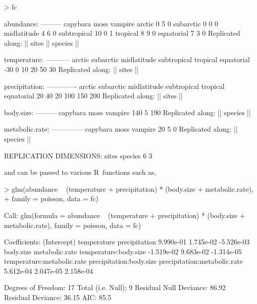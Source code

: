 \documentclass{article}
\newcommand{\R}{{\sf R}}
\numberwithin{exercise}{section}
\begin{document}
\begin{Schunk}
\begin{Sinput}
> fc
\end{Sinput}
\begin{Soutput}
abundance:
---------
            capybara moss vampire
arctic             0    5       0
subarctic          0    0       0
midlatitude        4    6       0
subtropical       10    0       1
tropical           8    9       0
equatorial         7    3       0
Replicated along:  || sites || species || 


temperature:
-----------
     arctic   subarctic midlatitude subtropical    tropical  equatorial 
        -30           0          10          20          50          30 
Replicated along:  || sites || 


precipitation:
-------------
     arctic   subarctic midlatitude subtropical    tropical  equatorial 
         20          40          20         100         150         200 
Replicated along:  || sites || 


body.size:
---------
capybara     moss  vampire 
     140        5      190 
Replicated along:  || species || 


metabolic.rate:
--------------
capybara     moss  vampire 
      20        5        0 
Replicated along:  || species || 


REPLICATION DIMENSIONS: 
  sites species 
      6       3 
\end{Soutput}
\end{Schunk}
and can be passed to various \R\ functions such as,
\begin{Schunk}
\begin{Sinput}
> glm(abundance ~ (temperature + precipitation) * (body.size + metabolic.rate), 
+     family = poisson, data = fc)
\end{Sinput}
\begin{Soutput}
Call:  glm(formula = abundance ~ (temperature + precipitation) * (body.size + 
    metabolic.rate), family = poisson, data = fc)

Coefficients:
                 (Intercept)                   temperature                 precipitation  
                   9.990e-01                     1.745e-02                    -5.526e-03  
                   body.size                metabolic.rate         temperature:body.size  
                  -1.519e-02                     9.683e-02                    -1.314e-05  
  temperature:metabolic.rate       precipitation:body.size  precipitation:metabolic.rate  
                   5.612e-04                     2.047e-05                     2.158e-04  

Degrees of Freedom: 17 Total (i.e. Null);  9 Residual
Null Deviance:	    86.92 
Residual Deviance: 36.15 	AIC: 85.5 
\end{Soutput}
\end{Schunk}
\end{document}
